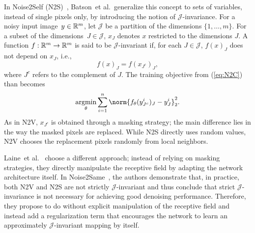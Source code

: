 In Noise2Self (N2S)~\cite{N2S}, Batson~et al.\ generalize this concept to sets of variables, instead of single pixels only, by introducing the notion of $\mathcal{J}$-invariance.
For a noisy input image~$y \in \mathbb{R}^m$, let $\mathcal{J}$ be a partition of the dimensions $\{1,\dots,m\}$.
For a subset of the dimensions~$J \in \mathcal{J}$, $x_J$ denotes $x$ restricted to the dimensions $J$.
A function $f: \mathbb{R}^m \rightarrow \mathbb{R}^m$ is said to be $\mathcal{J}$-invariant if, for each $J \in \mathcal{J}$, $f(x)_J$ does not depend on $x_J$, i.e.,
\begin{equation}
    f(x)_J = f(x_{J^c})_J,
\end{equation}
where $J^c$ refers to the complement of $J$.
The training objective from (\ref{eq:N2C}) than becomes
\begin{equation}
    \argmin_\theta \sum_{i=1}^{n} \norm{f_\theta(y^i_{J^c})_J - y^i_J}_2^2.
\end{equation}
As in N2V, $x_{J^c}$ is obtained through a masking strategy; the main difference lies in the way the masked pixels are replaced.
While N2S directly uses random values, N2V chooses the replacement pixels randomly from local neighbors.

Laine~et al.~\cite{BSN} choose a different approach; instead of relying on masking strategies, they directly manipulate the receptive field by adapting the network architecture itself.
In Noise2Same~\cite{Noise2Same}, the authors demonstrate that, in practice, both N2V and N2S are not strictly $\mathcal{J}$-invariant and thus conclude that strict $\mathcal{J}$-invariance is not necessary for achieving good denoising performance.
Therefore, they propose to do without explicit manipulation of the receptive field and instead add a regularization term that encourages the network to learn an approximately $\mathcal{J}$-invariant mapping by itself.

